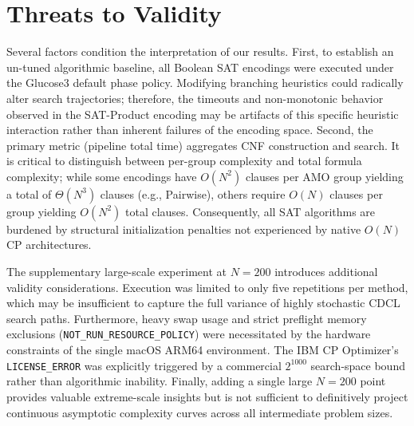 \section{Threats to Validity}
\label{sec:threats}

Several factors condition the interpretation of our results. First, to establish an un-tuned algorithmic baseline, all Boolean SAT encodings were executed under the Glucose3 default phase policy. Modifying branching heuristics could radically alter search trajectories; therefore, the timeouts and non-monotonic behavior observed in the SAT-Product encoding may be artifacts of this specific heuristic interaction rather than inherent failures of the encoding space. Second, the primary metric (pipeline total time) aggregates CNF construction and search. It is critical to distinguish between per-group complexity and total formula complexity; while some encodings have $O(N^2)$ clauses per AMO group yielding a total of $\Theta(N^3)$ clauses (e.g., Pairwise), others require $O(N)$ clauses per group yielding $O(N^2)$ total clauses. Consequently, all SAT algorithms are burdened by structural initialization penalties not experienced by native $O(N)$ CP architectures.

The supplementary large-scale experiment at $N=200$ introduces additional validity considerations. Execution was limited to only five repetitions per method, which may be insufficient to capture the full variance of highly stochastic CDCL search paths. Furthermore, heavy swap usage and strict preflight memory exclusions (\texttt{NOT\_RUN\_RESOURCE\_POLICY}) were necessitated by the hardware constraints of the single macOS ARM64 environment. The IBM CP Optimizer's \texttt{LICENSE\_ERROR} was explicitly triggered by a commercial $2^{1000}$ search-space bound rather than algorithmic inability. Finally, adding a single large $N=200$ point provides valuable extreme-scale insights but is not sufficient to definitively project continuous asymptotic complexity curves across all intermediate problem sizes.
